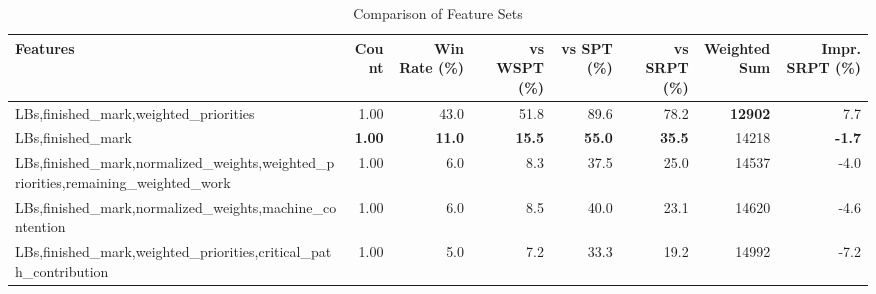\begin{table}[htbp]%
\centering%
\begin{tabular}{lrrrrrrr}%
\toprule%
\textbf{Features}&\textbf{Count}&\textbf{Win Rate (\%)}&\textbf{vs WSPT (\%)}&\textbf{vs SPT (\%)}&\textbf{vs SRPT (\%)}&\textbf{Weighted Sum}&\textbf{Impr. SRPT (\%)}\\%
\midrule%
LBs,finished_mark,weighted_priorities&1.00&43.0&51.8&89.6&78.2&\textbf{12902}&7.7\\%
LBs,finished_mark&\textbf{1.00}&\textbf{11.0}&\textbf{15.5}&\textbf{55.0}&\textbf{35.5}&14218&\textbf{-1.7}\\%
LBs,finished_mark,normalized_weights,weighted_priorities,remaining_weighted_work&1.00&6.0&8.3&37.5&25.0&14537&-4.0\\%
LBs,finished_mark,normalized_weights,machine_contention&1.00&6.0&8.5&40.0&23.1&14620&-4.6\\%
LBs,finished_mark,weighted_priorities,critical_path_contribution&1.00&5.0&7.2&33.3&19.2&14992&-7.2\\%
\bottomrule%
\end{tabular}%
\caption{Comparison of Feature Sets}%
\label{tab:features}%
\end{table}